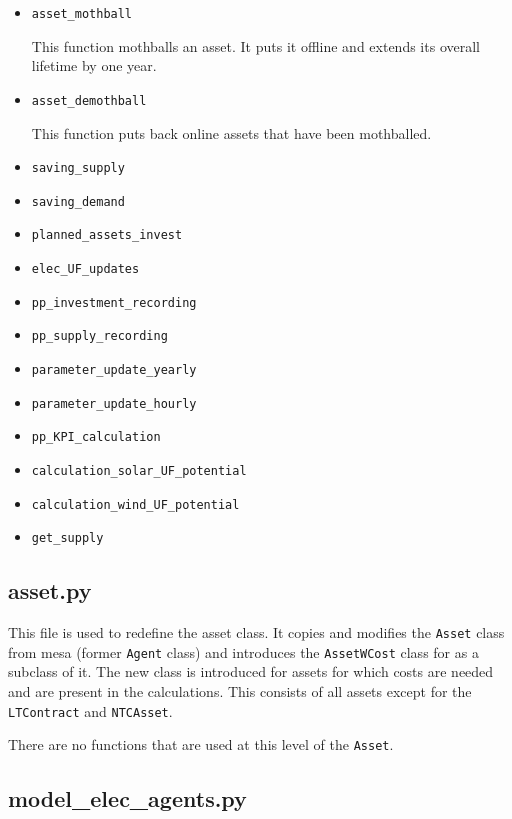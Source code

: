 \begin{itemize}
\item \texttt{asset\_mothball}

This function mothballs an asset. It puts it offline and extends its overall lifetime by one year.

\item \texttt{asset\_demothball}

This function puts back online assets that have been mothballed.

\item \texttt{saving\_supply}



\item \texttt{saving\_demand}
\item \texttt{planned\_assets\_invest}
\item \texttt{elec\_UF\_updates}
\item \texttt{pp\_investment\_recording}
\item \texttt{pp\_supply\_recording}
\item \texttt{parameter\_update\_yearly}
\item \texttt{parameter\_update\_hourly}
\item \texttt{pp\_KPI\_calculation}
\item \texttt{calculation\_solar\_UF\_potential}
\item \texttt{calculation\_wind\_UF\_potential}
\item \texttt{get\_supply}
\end{itemize}



\subsection{asset.py}

This file is used to redefine the asset class. It copies and modifies the \texttt{Asset} class from mesa (former \texttt{Agent} class) and introduces the \texttt{AssetWCost} class for as a subclass of it. The new class is introduced for assets for which costs are needed and are present in the calculations. This consists of all assets except for the \texttt{LTContract} and \texttt{NTCAsset}.

There are no functions that are used at this level of the \texttt{Asset}.


\subsection{model\_elec\_agents.py}


